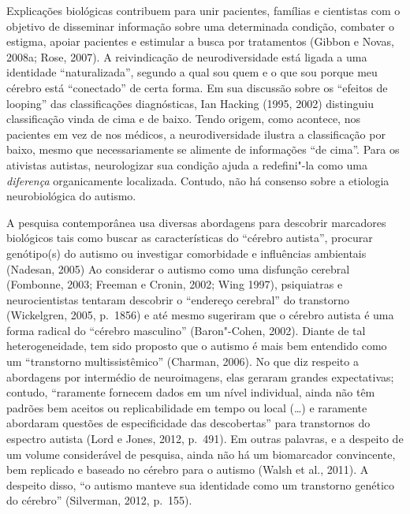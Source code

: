 Explicações biológicas contribuem para unir pacientes, famílias e
cientistas com o objetivo de disseminar informação sobre uma determinada
condição, combater o estigma, apoiar pacientes e estimular a busca por
tratamentos (Gibbon e Novas, 2008a; Rose, 2007). A reivindicação de
neurodiversidade está ligada a uma identidade ``naturalizada'', segundo
a qual sou quem e o que sou porque meu cérebro está ``conectado'' de
certa forma. Em sua discussão sobre os ``efeitos de looping'' das
classificações diagnósticas, Ian Hacking (1995, 2002) distinguiu
classificação vinda de cima e de baixo. Tendo origem, como acontece, nos
pacientes em vez de nos médicos, a neurodiversidade ilustra a
classificação por baixo, mesmo que necessariamente se alimente de
informações ``de cima''. Para os ativistas autistas, neurologizar sua
condição ajuda a redefini"-la como uma \emph{diferença} organicamente
localizada. Contudo, não há consenso sobre a etiologia neurobiológica do
autismo.

A pesquisa contemporânea usa diversas abordagens para descobrir
marcadores biológicos tais como buscar as características do ``cérebro
autista'', procurar genótipo(s) do autismo ou investigar comorbidade e
influências ambientais (Nadesan, 2005) Ao considerar o autismo como uma
disfunção cerebral (Fombonne, 2003; Freeman e Cronin, 2002; Wing 1997),
psiquiatras e neurocientistas tentaram descobrir o ``endereço cerebral''
do transtorno (Wickelgren, 2005, p.~1856) e até mesmo sugeriram que o
cérebro autista é uma forma radical do ``cérebro masculino''
(Baron"-Cohen, 2002). Diante de tal heterogeneidade, tem sido proposto
que o autismo é mais bem entendido como um ``transtorno
multissistêmico'' (Charman, 2006). No que diz respeito a abordagens por
intermédio de neuroimagens, elas geraram grandes expectativas; contudo,
``raramente fornecem dados em um nível individual, ainda não têm padrões
bem aceitos ou replicabilidade em tempo ou local (\ldots{}) e raramente
abordaram questões de especificidade das descobertas'' para transtornos
do espectro autista (Lord e Jones, 2012, p.~491). Em outras palavras, e a
despeito de um volume considerável de pesquisa, ainda não há um
biomarcador convincente, bem replicado e baseado no cérebro para o
autismo (Walsh et al., 2011). A despeito disso, ``o autismo manteve sua
identidade como um transtorno genético do cérebro'' (Silverman, 2012,
p.~155).

